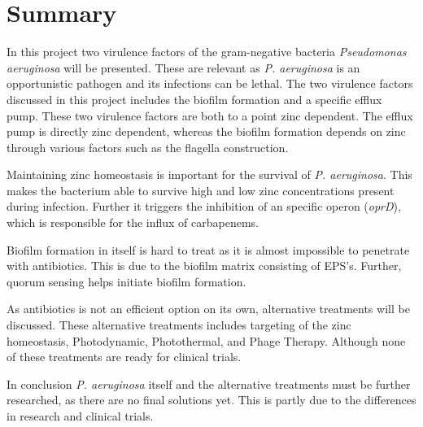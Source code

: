 \section{Summary}
In this project two virulence factors of the gram-negative bacteria \textit{Pseudomonas aeruginosa} will be presented. These are relevant as \textit{P. aeruginosa} is an opportunistic pathogen and its infections can be lethal. The two virulence factors discussed in this project includes the biofilm formation and a specific efflux pump. These two virulence factors are both to a point zinc dependent. The efflux pump is directly zinc dependent, whereas the biofilm formation depends on zinc through various factors such as the flagella construction. 

Maintaining zinc homeostasis is important for the survival of \textit{P. aeruginosa}. This makes the bacterium able to survive high and low zinc concentrations present during infection. Further it triggers the inhibition of an specific operon (\textit{oprD}), which is responsible for the influx of carbapenems. 

Biofilm formation in itself is hard to treat as it is almost impossible to penetrate with antibiotics. This is due to the biofilm matrix consisting of EPS's. Further, quorum sensing helps initiate biofilm formation. 

As antibiotics is not an efficient option on its own, alternative treatments will be discussed. These alternative treatments includes targeting of the zinc homeostasis, Photodynamic, Photothermal, and Phage Therapy. Although none of these treatments are ready for clinical trials. 

In conclusion \textit{P. aeruginosa} itself and the alternative treatments must be further researched, as there are no final solutions yet. This is partly due to the differences in research and clinical trials. 
